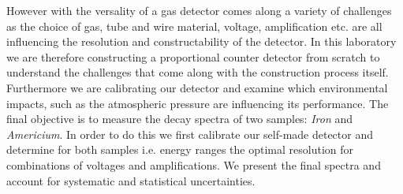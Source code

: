 However with the versality of a gas detector comes along a variety of challenges
as the choice of gas, tube and wire material, voltage, amplification etc. are
all influencing the resolution and constructability of the detector. In this
laboratory we are therefore constructing a proportional counter detector from
scratch to understand the challenges that come along with the construction
process itself. Furthermore we are calibrating our detector and examine which
environmental impacts, such as the atmospheric pressure are influencing its
performance. The final objective is to measure the decay spectra of two samples:
\emph{Iron} and \emph{Americium}. In order to do this we first calibrate our self-made
detector and determine for both samples i.e. energy ranges the optimal
resolution for combinations of voltages and amplifications. We present the final
spectra and account for systematic and statistical uncertainties.